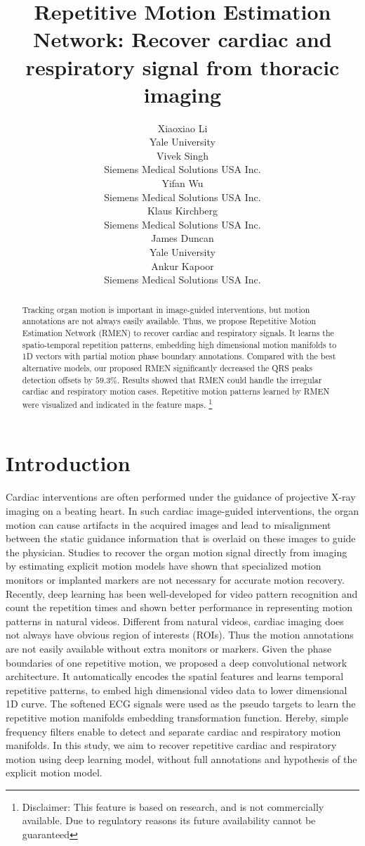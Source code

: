 \documentclass{article}
\title{Repetitive Motion Estimation Network: Recover cardiac and respiratory signal from thoracic imaging}
\author{
  Xiaoxiao Li \\
  Yale University\\
  \And
  Vivek Singh\\
  Siemens Medical Solutions USA Inc.\\
  \AND
  Yifan Wu\\
  Siemens Medical Solutions USA Inc.\\
  \And
  Klaus Kirchberg\\
  Siemens Medical Solutions USA Inc.\\
  \And
  James Duncan\\
  Yale University\\
  \And
  Ankur Kapoor\\
  Siemens Medical Solutions USA Inc.\\
}
\begin{document}

\maketitle

\begin{abstract}
Tracking organ motion is important in image-guided interventions, but motion annotations are not always easily available. Thus, we propose Repetitive Motion Estimation Network (RMEN) to recover cardiac and respiratory signals. It learns the spatio-temporal repetition patterns, embedding high dimensional motion manifolds to 1D vectors with partial motion phase boundary annotations. Compared with the best alternative models, our proposed RMEN significantly decreased the QRS peaks detection offsets by $59.3\%$. Results showed that RMEN could handle the irregular cardiac and respiratory motion cases. Repetitive motion patterns learned by RMEN were visualized and indicated in the feature maps. \footnote{Disclaimer: This feature is based on research, and is not commercially available. Due to regulatory reasons its future availability cannot be guaranteed}
\end{abstract}

\section{Introduction}
Cardiac interventions are often performed under the guidance of projective X-ray imaging on a beating heart. In such cardiac image-guided interventions, the organ motion can cause artifacts in the acquired images and lead to misalignment between the static guidance information that is overlaid on these images to guide the physician\cite{mcclelland2013respiratory}. Studies to recover the organ motion signal directly from imaging by estimating explicit motion models \cite{low2010application,shechter2006displacement} have shown that specialized motion monitors or implanted markers are not necessary for accurate motion recovery. Recently, deep learning has been well-developed for video pattern recognition \cite{karpathy2014large} and count the repetition times \cite{levy2015live} and shown better performance in representing motion patterns in natural videos. Different from natural videos, cardiac imaging does not always have obvious region of interests (ROIs). Thus the motion annotations are not easily available without extra monitors or markers. Given the phase boundaries of one repetitive motion, we proposed a deep convolutional network architecture. It automatically encodes the spatial features and learns temporal repetitive patterns, to embed high dimensional video data to lower dimensional 1D curve. The softened ECG signals were used as the pseudo targets to learn the repetitive motion manifolds embedding transformation function. Hereby, simple frequency filters enable to detect and separate cardiac and respiratory motion manifolds. In this study, we aim to recover repetitive cardiac and respiratory motion using deep learning model, without full annotations and hypothesis of the explicit motion model.
\end{document}
